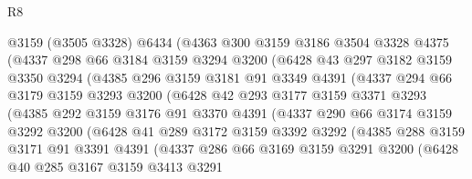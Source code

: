 \begin{lexlean}{R8}
\begin{coremodule}
            @3159
            (@3505 @3328)
            @6434
            (@4363
              @300
              @3159
              @3186
              @3504
              @3328
              @4375
              (@4337
                @298
                @66
                @3184
                @3159
                @3294
                @3200
                (@6428
                  @43
                  @297
                  @3182
                  @3159
                  @3350
                  @3294
                  (@4385
                    @296
                    @3159
                    @3181
                    @91
                    @3349
                    @4391
                    (@4337
                      @294
                      @66
                      @3179
                      @3159
                      @3293
                      @3200
                      (@6428
                        @42
                        @293
                        @3177
                        @3159
                        @3371
                        @3293
                        (@4385
                          @292
                          @3159
                          @3176
                          @91
                          @3370
                          @4391
                          (@4337
                            @290
                            @66
                            @3174
                            @3159
                            @3292
                            @3200
                            (@6428
                              @41
                              @289
                              @3172
                              @3159
                              @3392
                              @3292
                              (@4385
                                @288
                                @3159
                                @3171
                                @91
                                @3391
                                @4391
                                (@4337
                                  @286
                                  @66
                                  @3169
                                  @3159
                                  @3291
                                  @3200
                                  (@6428
                                    @40
                                    @285
                                    @3167
                                    @3159
                                    @3413
                                    @3291

\end{coremodule}
\end{lexlean}
